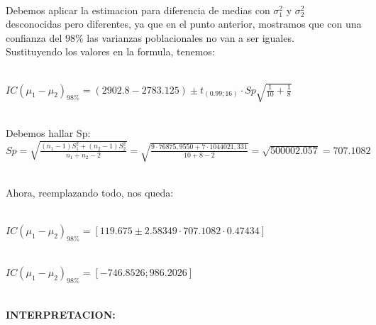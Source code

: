 \documentclass[letterpaper,12pt,onecolumn,titlepage]{article}
\begin{document}
~\\ Debemos aplicar la estimacion para diferencia de medias con $\sigma_{1}^2$ y $\sigma_{2}^2$ desconocidas pero diferentes, ya que en el punto anterior, mostramos que con una confianza del $98\%$ las varianzas poblacionales no van a ser iguales.
~\\ Sustituyendo los valores en la formula, tenemos:

~\\ $IC(\mu_1 - \mu_2)_{98\%}=(2902.8-2783.125)\pm t_{(0.99;16)}\cdot Sp\sqrt{\frac{1}{10}+\frac{1}{8}}$ 

~\\ Debemos hallar Sp:
~\\ $Sp=\sqrt{\frac{(n_{1}-1)S_{1}^2+(n_{2}-1)S_{2}^2}{n_{1}+n_{2}-2}}=\sqrt{\frac{9\cdot76875,9550+7\cdot1044021,331}{10+8-2}}=\sqrt{500002.057}=707.1082$

~\\ Ahora, reemplazando todo, nos queda:

~\\ $IC(\mu_1 - \mu_2)_{98\%}=[119.675 \pm 2.58349 \cdot 707.1082 \cdot 0.47434]$

~\\ $IC(\mu_1 - \mu_2)_{98\%}=[-746.8526 ; 986.2026]$

\pagebreak
~\\ \textbf{INTERPRETACION:}
\end{document}
